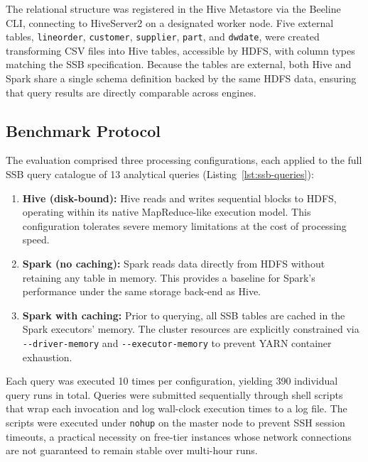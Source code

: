 The relational structure was registered in the Hive Metastore via the Beeline
CLI, connecting to HiveServer2 on a designated worker node. Five external
tables, \texttt{lineorder}, \texttt{customer}, \texttt{supplier},
\texttt{part}, and \texttt{dwdate}, were created transforming CSV files into Hive tables, accessible by HDFS, 
with column types matching the SSB specification.
Because the tables are external, both Hive and Spark share a
single schema definition backed by the same HDFS data, ensuring that query
results are directly comparable across engines.

\subsection{Benchmark Protocol}

The evaluation comprised three processing configurations, each applied to the
full SSB query catalogue of 13 analytical queries (Listing~\ref{lst:ssb-queries}):

\begin{enumerate}
    \item \textbf{Hive (disk-bound):} Hive reads and writes sequential blocks
    to HDFS, operating within its native MapReduce-like execution model. This
    configuration tolerates severe memory limitations at the cost of processing
    speed.
    \item \textbf{Spark (no caching):} Spark reads data directly from
    HDFS without retaining any table in memory. This provides a baseline for
    Spark's performance under the same storage back-end as Hive.
    \item \textbf{Spark with caching:} Prior to querying, all SSB tables are
    cached in the Spark executors' memory. The cluster resources are explicitly
    constrained via \texttt{-{}-driver-memory} and \texttt{-{}-executor-memory}
    to prevent YARN container exhaustion.
\end{enumerate}

Each query was executed 10 times per configuration, yielding 390 individual
query runs in total.
Queries were submitted sequentially through shell scripts that wrap
each invocation and log wall-clock execution times to a
log file. The scripts were executed under \texttt{nohup} on the master node to
prevent SSH session timeouts, a practical necessity on free-tier instances whose
network connections are not guaranteed to remain stable over multi-hour runs.

